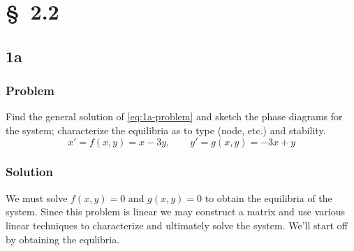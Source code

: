 \documentclass[12pt]{article}
\begin{document}
\section{\S~2.2}
\subsection{1a}
\subsubsection*{Problem}
Find the general solution of \cref{eq:1a-problem} and sketch the phase diagrams
for the system; characterize the equilibria as to type (node, etc.) and
stability.
\begin{equation}
  \label{eq:1a-problem}
  x'=f(x,y)=x-3y,\qquad y'=g(x,y)=-3x+y
\end{equation}
\subsubsection*{Solution}
We must solve $f(x,y)=0$ and $g(x,y)=0$ to obtain the equilibria of the system.
Since this problem is linear we may construct a matrix and use various linear
techniques to characterize and ultimately solve the system. We'll start off by
obtaining the equlibria.
\end{document}
